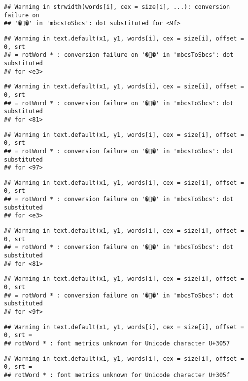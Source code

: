 \documentclass[]{article}
\begin{document}
\begin{verbatim}
## Warning in strwidth(words[i], cex = size[i], ...): conversion failure on
## '��' in 'mbcsToSbcs': dot substituted for <9f>
\end{verbatim}

\begin{verbatim}
## Warning in text.default(x1, y1, words[i], cex = size[i], offset = 0, srt
## = rotWord * : conversion failure on '��' in 'mbcsToSbcs': dot substituted
## for <e3>
\end{verbatim}

\begin{verbatim}
## Warning in text.default(x1, y1, words[i], cex = size[i], offset = 0, srt
## = rotWord * : conversion failure on '��' in 'mbcsToSbcs': dot substituted
## for <81>
\end{verbatim}

\begin{verbatim}
## Warning in text.default(x1, y1, words[i], cex = size[i], offset = 0, srt
## = rotWord * : conversion failure on '��' in 'mbcsToSbcs': dot substituted
## for <97>
\end{verbatim}

\begin{verbatim}
## Warning in text.default(x1, y1, words[i], cex = size[i], offset = 0, srt
## = rotWord * : conversion failure on '��' in 'mbcsToSbcs': dot substituted
## for <e3>
\end{verbatim}

\begin{verbatim}
## Warning in text.default(x1, y1, words[i], cex = size[i], offset = 0, srt
## = rotWord * : conversion failure on '��' in 'mbcsToSbcs': dot substituted
## for <81>
\end{verbatim}

\begin{verbatim}
## Warning in text.default(x1, y1, words[i], cex = size[i], offset = 0, srt
## = rotWord * : conversion failure on '��' in 'mbcsToSbcs': dot substituted
## for <9f>
\end{verbatim}

\begin{verbatim}
## Warning in text.default(x1, y1, words[i], cex = size[i], offset = 0, srt =
## rotWord * : font metrics unknown for Unicode character U+3057
\end{verbatim}

\begin{verbatim}
## Warning in text.default(x1, y1, words[i], cex = size[i], offset = 0, srt =
## rotWord * : font metrics unknown for Unicode character U+305f
\end{verbatim}
\end{document}

